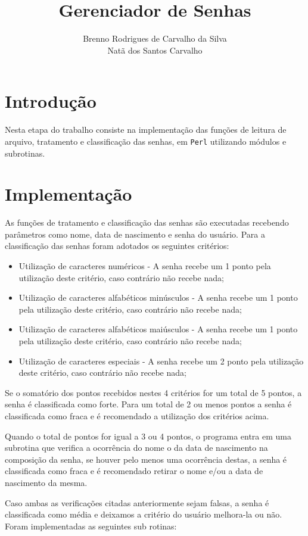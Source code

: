 \documentclass[
article,			%
11pt,				%
oneside,			%
a4paper,			%
english,			%
brazil,				%
sumario=tradicional
]{abntex2}
\title{\textbf{Gerenciador de Senhas}}
\author{Brenno Rodrigues de Carvalho da Silva\\ Natã dos Santos Carvalho}
\begin{document}
\frenchspacing 
\maketitle

\section{Introdução}
Nesta etapa do trabalho consiste na implementação das funções de leitura de arquivo, tratamento e classificação das senhas, em \verb!Perl! utilizando módulos e subrotinas.

\section{Implementação}
As funções de tratamento e classificação das senhas são executadas recebendo parâmetros como nome, data de nascimento e senha do usuário. Para a classificação das senhas foram adotados os seguintes critérios:

\begin{itemize}
	\item Utilização de caracteres numéricos - A senha recebe um 1 ponto pela utilização deste critério, caso contrário não recebe nada;
	\item Utilização de caracteres alfabéticos minúsculos - A senha recebe um 1 ponto pela utilização deste critério, caso contrário não recebe nada;
	\item Utilização de caracteres alfabéticos maiúsculos - A senha recebe um 1 ponto pela utilização deste critério, caso contrário não recebe nada;
	\item Utilização de caracteres especiais - A senha recebe um 2 ponto pela utilização deste critério, caso contrário não recebe nada;
\end{itemize}

Se o somatório dos pontos recebidos nestes 4 critérios for um total de 5 pontos, a senha é classificada como forte. Para um total de 2 ou menos pontos a senha é classificada como fraca e é recomendado a utilização dos critérios acima. 

Quando o total de pontos for igual a 3 ou 4 pontos, o programa entra em uma subrotina que verifica a ocorrência do nome o da data de nascimento na composição da senha, se houver pelo menos uma ocorrência destas, a senha é classificada como fraca e é recomendado retirar o nome e/ou a data de nascimento da mesma. 

Caso ambas as verificações citadas anteriormente sejam falsas, a senha é classificada como média e deixamos a critério do usuário melhora-la ou não.
Foram implementadas as seguintes sub rotinas:
\end{document}

